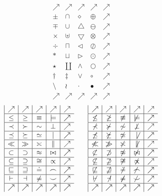 \bigodot\documentclass[11pt]{article}
\begin{document}
\newpage
$$
\begin{array}{|c|c|c|c|c}
\nearrow &
\nearrow &
\nearrow &
\nearrow &
\nearrow \\\hline
\pm&\cap&\diamond&\oplus& \nearrow\\\hline
\mp&\cup&\bigtriangleup&\ominus& \nearrow\\\hline
\times&\uplus&\bigtriangledown&\otimes& \nearrow\\\hline
\div&\sqcap&\triangleleft&\oslash& \nearrow\\\hline
\ast&\sqcup&\triangleright&\odot& \nearrow\\\hline
\star&\amalg&\wedge&\bigcirc& \nearrow\\\hline
\dagger&\ddagger&\vee&\circ& \nearrow\\\hline
\setminus&\wr&\cdot&\bullet& \nearrow\\\hline
\nearrow &
\nearrow &
\nearrow &
\nearrow &
\nearrow
\end{array}
$$
\newpage
$$
\begin{array}{|c|c|c|c|c}
\nearrow &
\nearrow &
\nearrow &
\nearrow &
\nearrow \\\hline
\leq &
\geq &
\equiv &
\models &
\nearrow \\\hline
\prec &
\succ &
\sim &
\perp &
\nearrow \\\hline
\preceq &
\succeq &
\simeq &
\mid &
\nearrow \\\hline
\ll &
\gg &
\asymp &
\parallel &
\nearrow \\\hline
\subset &
\supset &
\approx &
\bowtie &
\nearrow \\\hline
\subseteq &
\supseteq &
\cong &
\propto &
\nearrow \\\hline
\sqsubseteq &
\sqsupseteq &
\doteq &
\frown &
\nearrow \\\hline
\vdash &
\dashv &
\neq &
\smile &
\nearrow \\\hline
\nearrow &
\nearrow &
\nearrow &
\nearrow &
\nearrow
\end{array}
\qquad
\begin{array}{|c|c|c|c|c}
\nearrow &
\nearrow &
\nearrow &
\nearrow &
\nearrow \\\hline
\not\leq &
\not\geq &
\not\equiv &
\not\models &
\nearrow \\\hline
\not\prec &
\not\succ &
\not\sim &
\not\perp &
\nearrow \\\hline
\not\preceq &
\not\succeq &
\not\simeq &
\not\mid &
\nearrow \\\hline
\not\ll &
\not\gg &
\not\asymp &
\not\parallel &
\nearrow \\\hline
\not\subset &
\not\supset &
\not\approx &
\not\bowtie &
\nearrow \\\hline
\not\subseteq &
\not\supseteq &
\not\cong &
\not\propto &
\nearrow \\\hline
\not\sqsubseteq &
\not\sqsupseteq &
\not\doteq &
\not\frown &
\nearrow \\\hline
\not\vdash &
\not\dashv &
\not\neq &
\not\smile &
\nearrow \\\hline
\nearrow &
\nearrow &
\nearrow &
\nearrow &
\nearrow
\end{array}
$$
\end{document}
